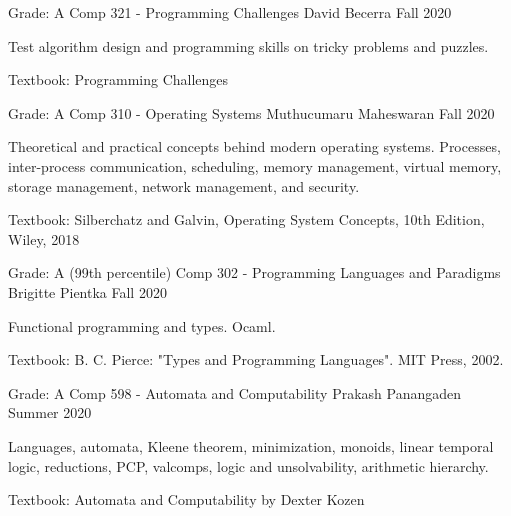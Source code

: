 \begin{cventries}
  \cventry
    {Grade: A}
    {Comp 321 - Programming Challenges} %
    {David Becerra} %
    {Fall 2020} %
    {
      \begin{cvitems} %
      \item {Test algorithm design and programming skills on tricky problems and puzzles.}
      \item {Textbook: Programming Challenges}
      \end{cvitems}
    }

  \cventry
    {Grade: A}
    {Comp 310 - Operating Systems} %
    {Muthucumaru Maheswaran} %
    {Fall 2020} %
    {
      \begin{cvitems} %
      \item {Theoretical and practical concepts behind modern operating systems. Processes, inter-process communication, scheduling, memory management, virtual memory, storage management, network management, and security.}
      \item {Textbook: Silberchatz and Galvin, Operating System Concepts, 10th Edition, Wiley, 2018}
      \end{cvitems}
    }

  \cventry
    {Grade: A (99th percentile)}
    {Comp 302 - Programming Languages and Paradigms} %
    {Brigitte Pientka } %
    {Fall 2020} %
    {
      \begin{cvitems} %
      \item {Functional programming and types. Ocaml.}
      \item {Textbook: B. C. Pierce: "Types and Programming Languages". MIT Press, 2002.}
      \end{cvitems}
    }

  \cventry
    {Grade: A}
    {Comp 598 - Automata and Computability} %
    {Prakash Panangaden} %
    {Summer 2020} %
    {
      \begin{cvitems} %
      \item {Languages, automata, Kleene theorem, minimization, monoids, linear temporal logic, reductions, PCP, valcomps, logic and unsolvability, arithmetic hierarchy.}
      \item {Textbook: Automata and Computability by Dexter Kozen}
      \end{cvitems}
    }


\end{cventries}
